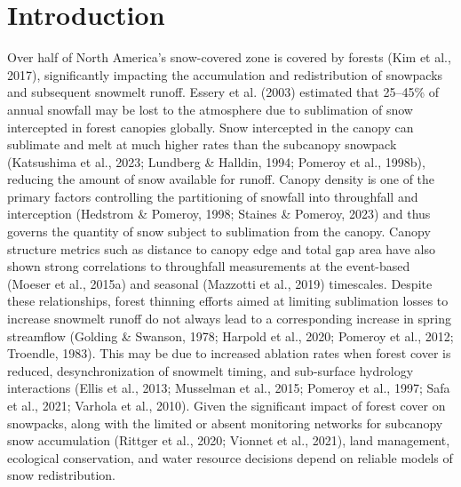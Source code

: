 \documentclass[
  letterpaper,
]{tex/uofsthesis-cs}
\begin{document}
\section{Introduction}\label{introduction-2}

Over half of North America's snow-covered zone is covered by forests
(Kim et al., 2017), significantly impacting the accumulation and
redistribution of snowpacks and subsequent snowmelt runoff. Essery et
al. (2003) estimated that 25--45\% of annual snowfall may be lost to the
atmosphere due to sublimation of snow intercepted in forest canopies
globally. Snow intercepted in the canopy can sublimate and melt at much
higher rates than the subcanopy snowpack (Katsushima et al., 2023;
Lundberg \& Halldin, 1994; Pomeroy et al., 1998b), reducing the amount
of snow available for runoff. Canopy density is one of the primary
factors controlling the partitioning of snowfall into throughfall and
interception (Hedstrom \& Pomeroy, 1998; Staines \& Pomeroy, 2023) and
thus governs the quantity of snow subject to sublimation from the
canopy. Canopy structure metrics such as distance to canopy edge and
total gap area have also shown strong correlations to throughfall
measurements at the event-based (Moeser et al., 2015a) and seasonal
(Mazzotti et al., 2019) timescales. Despite these relationships, forest
thinning efforts aimed at limiting sublimation losses to increase
snowmelt runoff do not always lead to a corresponding increase in spring
streamflow (Golding \& Swanson, 1978; Harpold et al., 2020; Pomeroy et
al., 2012; Troendle, 1983). This may be due to increased ablation rates
when forest cover is reduced, desynchronization of snowmelt timing, and
sub-surface hydrology interactions (Ellis et al., 2013; Musselman et
al., 2015; Pomeroy et al., 1997; Safa et al., 2021; Varhola et al.,
2010). Given the significant impact of forest cover on snowpacks, along
with the limited or absent monitoring networks for subcanopy snow
accumulation (Rittger et al., 2020; Vionnet et al., 2021), land
management, ecological conservation, and water resource decisions depend
on reliable models of snow redistribution.
\end{document}
